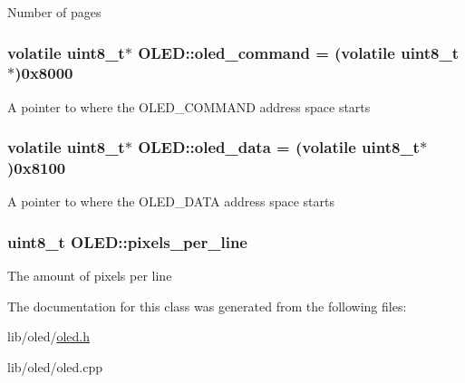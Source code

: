Number of pages \hypertarget{class_o_l_e_d_af0a85ccd0274347b8c1ac77d298a14cf}{
\subsubsection[{oled\-\_\-command}]{\setlength{\rightskip}{0pt plus 5cm}volatile uint8\-\_\-t$\ast$ O\-L\-E\-D\-::oled\-\_\-command = (volatile uint8\-\_\-t$\ast$)0x8000\hspace{0.3cm}{\ttfamily [private]}}}\label{class_o_l_e_d_af0a85ccd0274347b8c1ac77d298a14cf}
A pointer to where the O\-L\-E\-D\-\_\-\-C\-O\-M\-M\-A\-N\-D address space starts \hypertarget{class_o_l_e_d_a1bc54d49808f92ddfc354511b692df6f}{
\subsubsection[{oled\-\_\-data}]{\setlength{\rightskip}{0pt plus 5cm}volatile uint8\-\_\-t$\ast$ O\-L\-E\-D\-::oled\-\_\-data = (volatile uint8\-\_\-t$\ast$)0x8100\hspace{0.3cm}{\ttfamily [private]}}}\label{class_o_l_e_d_a1bc54d49808f92ddfc354511b692df6f}
A pointer to where the O\-L\-E\-D\-\_\-\-D\-A\-T\-A address space starts \hypertarget{class_o_l_e_d_a6ddac7b826eccac8c682c5246ef52b29}{
\subsubsection[{pixels\-\_\-per\-\_\-line}]{\setlength{\rightskip}{0pt plus 5cm}uint8\-\_\-t O\-L\-E\-D\-::pixels\-\_\-per\-\_\-line\hspace{0.3cm}{\ttfamily [private]}}}\label{class_o_l_e_d_a6ddac7b826eccac8c682c5246ef52b29}
The amount of pixels per line 

The documentation for this class was generated from the following files\-:\begin{DoxyCompactItemize}
\item 
lib/oled/\hyperlink{oled_8h}{oled.\-h}\item 
lib/oled/oled.\-cpp\end{DoxyCompactItemize}
